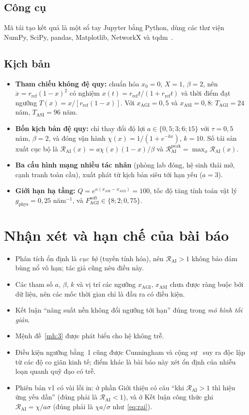\documentclass[12pt,a4paper,openany]{report}
\numberwithin{equation}{chapter}   %
\theoremstyle{definition}
\newcommand{\RAI}{\mathcal{R}_{\mathrm{AI}}}
\begin{document}
\subsection{Công cụ}
Mã tái tạo kết quả là một sổ tay Jupyter bằng Python, dùng các thư viện NumPy, SciPy, pandas, Matplotlib, NetworkX và tqdm~\cite{burtsevcode}.

\subsection{Kịch bản}
\begin{itemize}
  \item \textbf{Tham chiếu không đệ quy:} chuẩn hóa $x_0=0$, $X=1$, $\beta=2$, nên $\dot{x}=r_{\mathrm{ref}}(1-x)^2$ có nghiệm $x(t)=r_{\mathrm{ref}}t/(1+r_{\mathrm{ref}}t)$ và thời điểm đạt ngưỡng $T(x)=x/[r_{\mathrm{ref}}(1-x)]$. Với $x_{\mathrm{AGI}}=0{,}5$ và $x_{\mathrm{ASI}}=0{,}8$: $T_{\mathrm{AGI}}=24$ năm, $T_{\mathrm{ASI}}=96$ năm.
  \item \textbf{Bốn kịch bản đệ quy:} chỉ thay đổi độ lợi $a\in\{0{,}5;3;6;15\}$ với $\tau=0{,}5$ năm, $\beta=2$, và đóng vận hành $\chi(x)=1/(1+e^{-kx})$, $k=10$. Số tái sản xuất cục bộ là $\RAI(x)=a\chi(x)(1-x)/\beta$ và $\RAI^{\mathrm{peak}}=\max_x\RAI(x)$.
  \item \textbf{Ba cấu hình mạng nhiều tác nhân} (phòng lab đóng, hệ sinh thái mở, cạnh tranh toàn cầu), xuất phát từ kịch bản siêu tới hạn yếu ($a=3$).
  \item \textbf{Giới hạn hạ tầng:} $Q=e^{\kappa(x_{\mathrm{ASI}}-x_{\mathrm{AGI}})}=100$, tốc độ tăng tính toán vật lý $g_{\mathrm{phys}}=0{,}25$ năm$^{-1}$, và $F^{\mathrm{soft}}_{\mathrm{AGI}}\in\{8;2;0{,}75\}$.
\end{itemize}

\section{Nhận xét và hạn chế của bài báo}\label{sec:nhanxet}
\begin{itemize}
  \item Phân tích ổn định là \emph{cục bộ} (tuyến tính hóa), nên $\RAI>1$ không bảo đảm bùng nổ vô hạn; tác giả cũng nêu điều này.
  \item Các tham số $a$, $\beta$, $k$ và vị trí các ngưỡng $x_{\mathrm{AGI}}$, $x_{\mathrm{ASI}}$ chưa được ràng buộc bởi dữ liệu, nên các mốc thời gian chỉ là đầu ra có điều kiện.
  \item Kết luận ``năng suất nền không đổi ngưỡng tới hạn'' đúng trong \emph{mô hình tối giản}.
  \item Mệnh đề~\ref{mh:3} được phát biểu cho hệ không trễ.
  \item Điều kiện ngưỡng bằng~1 cũng được Cunningham và cộng sự~\cite{cunningham2026} suy ra độc lập từ các độ co giãn kinh tế; điểm khác là bài báo này xét ổn định của nhiễu loạn quanh quỹ đạo có trễ.
  \item Phiên bản v1 có vài lỗi in: ở phần Giới thiệu có câu ``khi $\RAI>1$ thì hiệu ứng yếu dần'' (đúng phải là $\RAI<1$), và ở Kết luận công thức ghi $\RAI=\chi/a\sigma$ (đúng phải là $\chi a/\sigma$ như~\eqref{eq:rai}).
\end{itemize}
\end{document}
